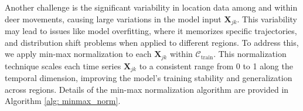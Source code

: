 \documentclass[11pt]{article}
\begin{document}
Another challenge is the significant variability in location data among and within deer movements, causing large variations in the model input $\bm{X}_{jk}$. This variability may lead to issues like model overfitting, where it memorizes specific trajectories, and distribution shift problems when applied to different regions. To address this, we apply min-max normalization to each $\bm{X}_{jk}$ within $\mathcal{C}_{\mathrm{train}}$. This normalization technique scales each time series $\bm{X}_{jk}$ to a consistent range from 0 to 1 along the temporal dimension, improving the model’s training stability and generalization across regions. Details of the min-max normalization algorithm are provided in Algorithm \ref{alg: minmax_norm}.


%
%
%
%
%
\end{document}
